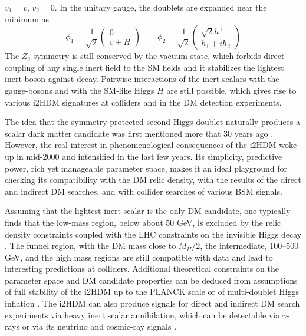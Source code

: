 \documentclass[12pt,a4paper]{article}
\begin{document}
$v_1 = v$, $v_2 = 0$.
In the unitary gauge, the doublets are expanded near the minimum as
\begin{equation}
\phi_1=\frac{1}{\sqrt{2}}
\begin{pmatrix}
0\\
v+H 
\end{pmatrix}
  \qquad
  \phi_2= \frac{1}{\sqrt{2}}
\begin{pmatrix}
 \sqrt{2}{h^+} \\
 h_1 + ih_2
\end{pmatrix}
\end{equation}
The $Z_2$ symmetry is still conserved by the vacuum state, which forbids direct coupling of any single inert field to the SM fields
and it stabilizes the lightest inert boson against decay. 
Pairwise interactions of the inert scalars with the gauge-bosons and with the SM-like Higgs $H$ are still possible,
which gives rise to various i2HDM signatures at colliders and in the DM detection experiments.


The idea that the symmetry-protected second Higgs doublet naturally produces a scalar dark matter candidate
was first mentioned more that 30 years ago \cite{Deshpande:1977rw}.
However, the real interest in phenomenological consequences of the i2HDM woke up in mid-2000 and intensified
in the last few years.
Its simplicity, predictive power, rich yet manageable parameter space, makes it an ideal playground for checking 
its compatibility with the DM relic density, with the results of the direct and indirect DM searches,
and with collider searches of various BSM signals.

Assuming that the lightest inert scalar is the only DM candidate,
one typically finds that the low-mass region, below about 50 GeV, is excluded 
by the relic density constraints coupled with the LHC constraints on the invisible Higgs decay 
\cite{Krawczyk:2013jta,Ilnicka:2015jba,Diaz:2015pyv}.
The funnel region, with the DM mass close to $M_H/2$, the intermediate, 100--500 GeV, 
and the high mass regions are still compatible with data and lead to interesting predictions at colliders.
Additional theoretical constraints on the parameter space and DM candidate properties
can be deduced from assumptions of full stability of the i2HDM up to the PLANCK scale
 \cite{Chakrabarty:2015yia,Khan:2015ipa} or of multi-doublet Higgs inflation \cite{Gong:2012ri}.
The i2HDM can also produce signals for direct \cite{Arina:2009um} and indirect DM search experiments via heavy inert scalar annihilation,
which can be detectable via $\gamma$-rays \cite{Modak:2015uda,Queiroz:2015utg,Garcia-Cely:2015khw}
or via its neutrino \cite{Agrawal:2008xz,Andreas:2009hj} and cosmic-ray signals \cite{Nezri:2009jd}.
\end{document}
